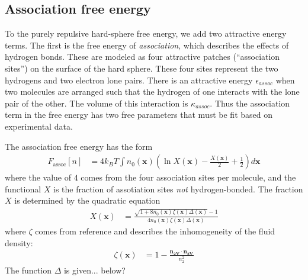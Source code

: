 \documentclass[letterpaper,twocolumn,amsmath,amssymb,prb]{revtex4-1}
\newcommand{\xx}{\textbf{x}}
\begin{document}
\subsection{Association free energy}
To the purely repulsive hard-sphere free energy, we add two attractive
energy terms.  The first is the free energy of \emph{association},
which describes the effects of hydrogen bonds.  These are modeled as
four attractive patches (``association sites'') on the surface of the
hard sphere.  These four sites represent the two hydrogens and two
electron lone pairs.  There is an attractive energy
$\epsilon_\textit{assoc}$ when two molecules are arranged such that
the hydrogen of one interacts with the lone pair of the other.  The
volume of this interaction is $\kappa_\textit{assoc}$.  Thus the
association term in the free energy has two free parameters that must
be fit based on experimental data.

The association free energy has the form
\begin{align}
  F_\text{assoc}[n] &= 4 k_BT \int n_0(\xx)
  \left(\ln X(\xx) - \frac{X(\xx)}{2} + \frac12\right) d\xx
\end{align}
where the value of $4$ comes from the four association sites per
molecule, and the functional $X$ is the fraction of assotiation sites
\emph{not} hydrogen-bonded.  The fraction $X$ is determined by the
quadratic equation
\begin{align}
  X(\xx) &= \frac{\sqrt{1 + 8n_0(\xx)\zeta(\xx)\Delta(\xx)} - 1}
  {4 n_0(\xx)\zeta(\xx)\Delta(\xx)}
\end{align}
where $\zeta$ comes from
reference\cite{yu2002fmt-dft-inhomogeneous-associating,
  fu2005vapor-liquid-dft} and describes the inhomogeneity of the fluid
density:
\begin{align}
  \zeta(\xx) &= 1 - \frac{\mathbf{n_{2V}}\cdot\mathbf{n_{2V}}}{n_2^2}
\end{align}
The function $\Delta$ is given... below?
\end{document}
